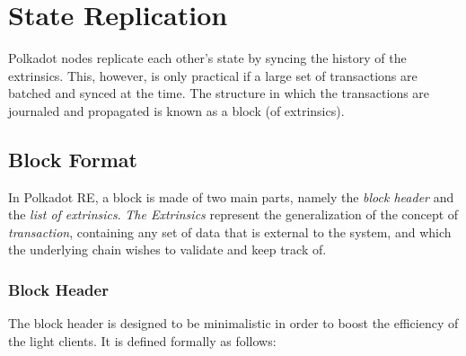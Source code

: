 \documentclass{book}
\newcommand{\tmem}[1]{{\em #1\/}}
\newcommand{\tmtextit}[1]{{\itshape{#1}}}
\begin{document}
\section{State Replication}\label{sect-state-replication}

Polkadot nodes replicate each other's state by syncing the history of the
extrinsics. This, however, is only practical if a large set of transactions
are batched and synced at the time. The structure in which the transactions
are journaled and propagated is known as a block (of extrinsics).

\subsection{Block Format}\label{sect-block-format}

In Polkadot RE, a block is made of two main parts, namely the \tmtextit{block
header} and the \tmtextit{list of extrinsics}. {\tmem{The Extrinsics}}
represent the generalization of the concept of {\tmem{transaction}},
containing any set of data that is external to the system, and which the
underlying chain wishes to validate and keep track of.

\subsubsection{Block Header}\label{block}

The block header is designed to be minimalistic in order to boost the
efficiency of the light clients. It is defined formally as follows:
\end{document}
